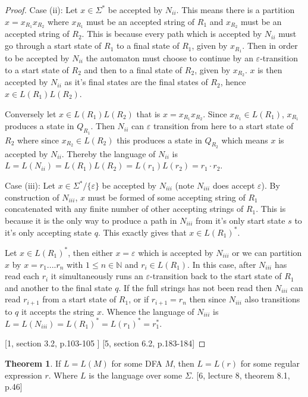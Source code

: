 \documentclass[a4paper,12pt]{report}
\theoremstyle{definition}
\newtheorem{theorem}{Theorem}[chapter]
\begin{document}
\begin{proof}
Case (ii):
Let $x\in\Sigma^*$ be accepted by $N_{ii}$. This means there is a partition $x=x_{R_1}x_{R_2}$ where $x_{R_1}$ must be an accepted string of $R_1$ and $x_{R_2}$ must be an accepted string of $R_2$.  This is because every path which is accepted by $N_{ii}$ must go through a start state of $R_1$ to a final state of $R_1$, given by $x_{R_1}$. Then in order to be accepted by $N_{ii}$ the automaton must choose to continue by an $\varepsilon$-transition to a start state of $R_2$ and then to a final state of $R_2$, given by $x_{R_2}$. $x$ is then accepted by $N_{ii}$ as it's final states are the final states of $R_2$, hence $x\in L(R_1)L(R_2)$. 

Conversely let $x\in L(R_1) L(R_2)$ that is $x=x_{R_1}x_{R_2}$. Since $x_{R_1}\in L(R_1)$, $x_{R_1}$ produces a state in $Q_{R_1}$. Then $N_{ii}$ can $\varepsilon$ transition from here to a start state of $R_2$ where since $x_{R_2}\in L(R_2)$ this produces a state in $Q_{R_2}$ which means $x$ is accepted by $N_{ii}$. Thereby the language of $N_{ii}$ is $L=L(N_{ii})=L(R_1)L(R_2)=L(r_1)L(r_2)=r_1\cdot r_2$.

Case (iii): 
Let $x\in\Sigma^*/\{\varepsilon\}$ be accepted by $N_{iii}$ (note $N_{iii}$ does accept $\varepsilon$). By construction of $N_{iii}$, $x$ must be formed of some accepting string of $R_1$ concatenated with any finite number of other accepting strings of $R_1$. This is because it is the only way to produce a path in $N_{iii}$ from it's only start state $s$ to it's only accepting state $q$. This exactly gives that $x\in L(R_1)^*$.

Let $x\in L(R_1)^*$, then either $x=\varepsilon$ which is accepted by $N_{iii}$ or we can partition $x$ by $x=r_1....r_n$ with $1\leq	n \in \mathbb{N}$ and $r_i\in L(R_1)$. In this case, after $N_{iii}$ has read each $r_i$ it simultaneously runs an $\varepsilon$-transition back to the start state of $R_1$ and another to the final state $q$. If the full strings has not been read then $N_{iii}$ can read $r_{i+1}$ from a start state of $R_1$, or if $r_{i+1}=r_n$ then since $N_{iii}$ also transitions to $q$ it accepts the string $x$. Whence the language of $N_{iii}$ is $L=L(N_{iii})=L(R_1)^*=L(r_1)^*=r_1^*$.

[1, section 3.2, p.103-105 ] [5, section 6.2, p.183-184]
\end{proof}

\begin{theorem}
\label{DFA->RegExp}
If $L=L(M)$ for some DFA $M$, then $L=L(r)$ for some regular expression $r$. Where $L$ is the language over some $\Sigma$. [6, lecture 8, theorem 8.1, p.46]
\end{theorem}
\end{document}
